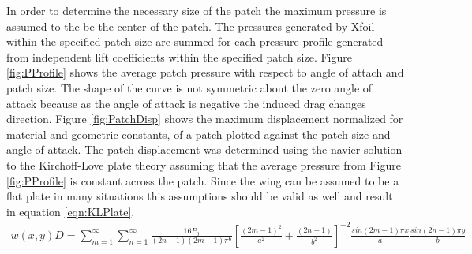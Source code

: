 \documentclass[11pt]{ucthesis}
\begin{document}
In order to determine the necessary size of the patch the maximum pressure is assumed to the be the center of the patch. The pressures generated by Xfoil  within the specified patch size are summed for each pressure profile generated from independent lift coefficients within the specified patch size. Figure \ref{fig:PProfile} shows the average patch pressure with respect to angle of attach and patch size. The shape of the curve is not symmetric about the zero angle of attack because as the angle of attack is negative the induced drag changes direction. Figure \ref{fig:PatchDisp} shows the maximum displacement normalized for material and geometric constants, of a patch plotted against the patch size and angle of attack. The patch displacement was determined using the navier solution to the Kirchoff-Love plate theory assuming that the average pressure from Figure \ref{fig:PProfile} is constant across the patch. Since the wing can be assumed to be a flat plate in many situations this assumptions should be valid as well and result in equation \ref{eqn:KLPlate}.
\small
\begin{eqnarray}
w(x,y)D = \sum_{m=1}^{\infty}\sum_{n=1}^{\infty}\frac{16P_0}{(2n-1)(2m-1)\pi^6}\left[\frac{(2m-1)^2}{a^2}+\frac{(2n-1)}{b^2}\right]^{-2}\frac{sin(2m-1)\pi x}{a}\frac{sin(2n-1)\pi y}{b}
\label{eqn:KLPlate}
\end{eqnarray}
\normalsize
\end{document}
